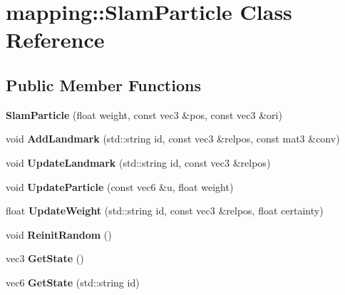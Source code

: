 \hypertarget{classmapping_1_1SlamParticle}{}\section{mapping\+:\+:Slam\+Particle Class Reference}
\label{classmapping_1_1SlamParticle}
\subsection*{Public Member Functions}
\begin{DoxyCompactItemize}
\item 
\mbox{\label{classmapping_1_1SlamParticle_a90815e29fd2a5825beab1822f65658f9}} 
{\bfseries Slam\+Particle} (float weight, const vec3 \&pos, const vec3 \&ori)
\item 
\mbox{\label{classmapping_1_1SlamParticle_ae9663a3fc8981eb7241867afba9a67ce}} 
void {\bfseries Add\+Landmark} (std\+::string id, const vec3 \&relpos, const mat3 \&conv)
\item 
\mbox{\label{classmapping_1_1SlamParticle_a70500368a754b3afb951e7c3563c76d4}} 
void {\bfseries Update\+Landmark} (std\+::string id, const vec3 \&relpos)
\item 
\mbox{\label{classmapping_1_1SlamParticle_aef4d4f875d436217e66cc5f4ce2c0e13}} 
void {\bfseries Update\+Particle} (const vec6 \&u, float weight)
\item 
\mbox{\label{classmapping_1_1SlamParticle_a5bd8b563af659480a63d4175af486c7b}} 
float {\bfseries Update\+Weight} (std\+::string id, const vec3 \&relpos, float certainty)
\item 
\mbox{\label{classmapping_1_1SlamParticle_a8ca7aa70e97f28c7073355c6188209a3}} 
void {\bfseries Reinit\+Random} ()
\item 
\mbox{\label{classmapping_1_1SlamParticle_a679d26cbc4759ba01dd6225dfad3d73f}} 
vec3 {\bfseries Get\+State} ()
\item 
\mbox{\label{classmapping_1_1SlamParticle_a32efb059738483df144287a171aa1c2f}} 
vec6 {\bfseries Get\+State} (std\+::string id)
\end{DoxyCompactItemize}
